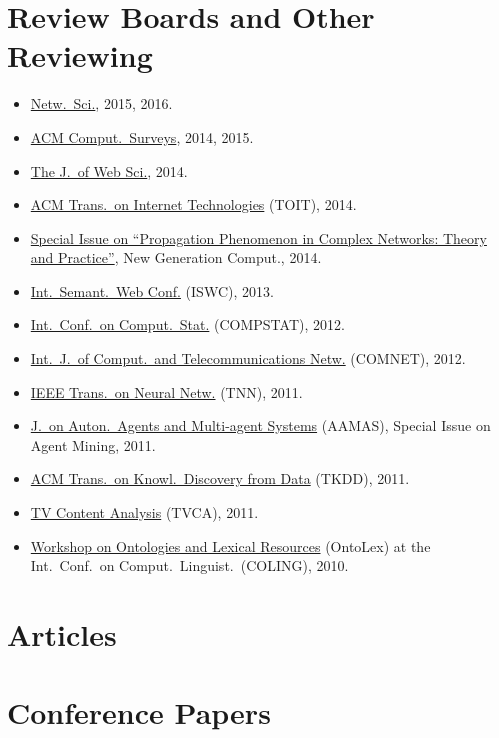 \documentclass[line,margin]{res}
\newcounter{x}
\begin{document}
\begin{resume}
\section{Review Boards and Other Reviewing}
\begin{itemize}
\item \href{http://journals.cambridge.org/action/displayJournal?jid=NWS}{Netw.\ Sci.}, 2015, 2016.
\item \href{http://surveys.acm.org/}{ACM Comput.\ Surveys}, 2014, 2015. 
\item \href{http://www.webscience-journal.net}{The J.\ of Web Sci.}, 2014. 
\item \href{http://toit.acm.org/}{ACM Trans.\ on Internet
  Technologies} (TOIT), 2014.  
\item \href{http://www.ii.pwr.wroc.pl/~krol/eng_EPP.htm}{Special
  Issue on ``Propagation Phenomenon in Complex Networks:  Theory and
  Practice''}, New Generation Comput., 2014. 
\item \href{http://iswc2013.semanticweb.org/}{Int.\ Semant.\ Web Conf.}
  (ISWC), 2013.  
\item \href{http://www.compstat2012.org/}{Int.\ Conf.\ on Comput.\ Stat.} (COMPSTAT), 2012.  
\item
  \href{http://www.journals.elsevier.com/computer-networks/}{Int.\ J.\ of
    Comput.\ and Telecommunications Netw.} (COMNET), 2012. 
\item \href{http://ieee-cis.org/pubs/tnn/}{IEEE Trans.\ on Neural
  Netw.} (TNN), 2011.   
\item
  \href{http://www.springer.com/computer/ai/journal/10458}{J.\ on Auton.\ Agents and Multi-agent Systems} (AAMAS), Special Issue on Agent Mining,
  2011. 
\item \href{http://tkdd.cs.uiuc.edu/}{ACM Trans.\ on Knowl.\ Discovery from Data} (TKDD), 2011.  
\item \href{http://mklab.iti.gr/tvca/}{TV Content Analysis} (TVCA), 2011.
\item \href{http://www.loa-cnr.it/ontolex2010}{Workshop on Ontologies
  and Lexical Resources} (OntoLex) at the Int.\ Conf.\ on Comput.\ Linguist.\ (COLING), 2010. 
\end{itemize}

\section{Articles}           
\section{Conference Papers}  

\end{resume}
\end{document}
